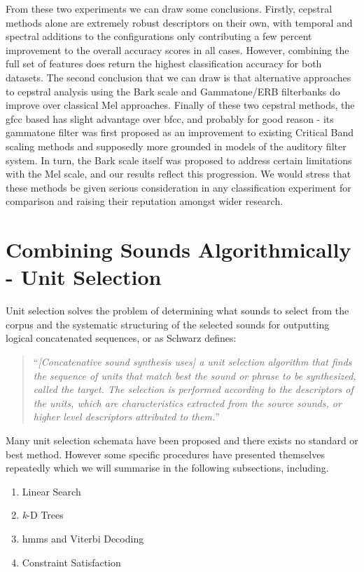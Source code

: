 {{{{{{{From these two experiments we can draw some conclusions. Firstly, cepstral methods alone are extremely robust descriptors on their own, with temporal and spectral additions to the configurations only contributing a few percent improvement to the overall accuracy scores in all cases. However, combining the full set of features does return the highest classification accuracy for both datasets. The second conclusion that we can draw is that alternative approaches to cepstral analysis using the Bark scale and Gammatone/ERB filterbanks do improve over classical Mel approaches.  Finally of these two cepstral methods, the \acrshort{gfcc} based has slight advantage over \acrshort{bfcc}, and probably for good reason - its gammatone filter was first proposed as an improvement to existing Critical Band scaling methods and supposedly more grounded in models of the auditory filter system. In turn, the Bark scale itself was proposed to address certain limitations with the Mel scale, and our results reflect this progression. We would stress that these methods be given serious consideration in any classification experiment for comparison and raising their reputation amongst wider research.

\section{Combining Sounds Algorithmically - Unit Selection}

Unit selection solves the problem of determining what sounds to select from the corpus and the systematic structuring of the selected sounds for outputting logical concatenated sequences, or as Schwarz defines:

\blockcquote[]{Schwarz2006b}{``\textit{[Concatenative sound synthesis uses] a unit selection algorithm that finds the sequence of units that match best the sound or phrase to be synthesized, called the target. The selection is performed according to the descriptors of the units, which are characteristics extracted from the source sounds, or higher level descriptors attributed to them.}''} 

 Many unit selection schemata have been proposed and there exists no standard or best method. However some specific procedures have presented themselves repeatedly which we will summarise in the following subsections, including.
 
 \begin{enumerate}
  \item Linear Search
  \item \textit{k}-D Trees
  \item \acrshort{hmm}s and Viterbi Decoding
  \item Constraint Satisfaction
\end{enumerate}


}}}}}}}
